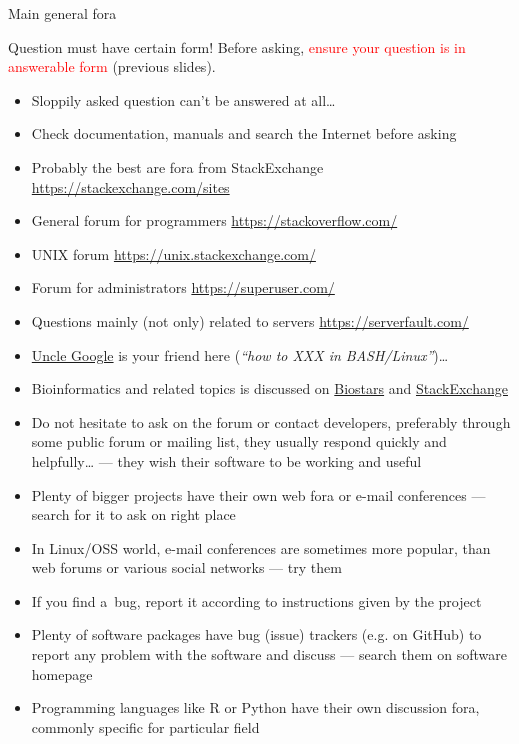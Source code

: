 \documentclass[compress, xelatex, 11pt, xcolor=svgnames, aspectratio=169, url={hyphens, lowtilde}]{beamer}
\renewcommand{\alert}[1]{\textcolor{red}{#1}}
\begin{document}
\begin{frame}[allowframebreaks]{Main general fora}
	\begin{block}{Question must have certain form!}
			Before asking, \alert{ensure your question is in answerable form} (previous slides).
		\begin{itemize}
			\item Sloppily asked question can't be answered at all\ldots
			\item Check documentation, manuals and search the Internet before asking
		\end{itemize}
	\end{block}
	\begin{itemize}
		\item Probably the best are fora from StackExchange \url{https://stackexchange.com/sites}
		\item General forum for programmers \url{https://stackoverflow.com/}
		\item UNIX forum \url{https://unix.stackexchange.com/}
		\item Forum for administrators \url{https://superuser.com/}
		\item Questions mainly (not only) related to servers \url{https://serverfault.com/}
		\item \href{https://www.startpage.com/}{Uncle Google} is your friend here (\textit{\enquote{how to XXX in BASH/Linux}})\ldots
		\item Bioinformatics and related topics is discussed on \href{https://www.biostars.org/}{Biostars} and \href{https://bioinformatics.stackexchange.com/}{StackExchange}
		\item Do not hesitate to ask on the forum or contact developers, preferably through some public forum or mailing list, they usually respond quickly and helpfully\ldots{ }--- they wish their software to be working and useful
		\item Plenty of bigger projects have their own web fora or e-mail conferences --- search for it to ask on right place
		\item In Linux/OSS world, e-mail conferences are sometimes more popular, than web forums or various social networks --- try them
		\item If you find a~bug, report it according to instructions given by the project
		\item Plenty of software packages have bug (issue) trackers (e.g. on GitHub) to report any problem with the software and discuss --- search them on software homepage
		\item Programming languages like R or Python have their own discussion fora, commonly specific for particular field
	\end{itemize}
\end{frame}
\end{document}
